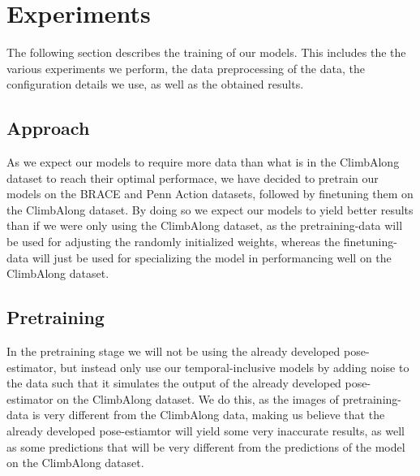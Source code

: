 \documentclass[./main.tex]{subfiles}
\begin{document}
\section{Experiments}
The following section describes the training of our models. This includes the the various experiments we perform, the data preprocessing of the data, the configuration details we use, as well as the obtained results.

\subsection{Approach}
As we expect our models to require more data than what is in the ClimbAlong dataset to reach their optimal performace, we have decided to pretrain our models on the BRACE and Penn Action datasets, followed by finetuning them on the ClimbAlong dataset. By doing so we expect our models to yield better results than if we were only using the ClimbAlong dataset, as the pretraining-data will be used for adjusting the randomly initialized weights, whereas the finetuning-data will just be used for specializing the model in performancing well on the ClimbAlong dataset.

\subsection{Pretraining}
In the pretraining stage we will not be using the already developed pose-estimator, but instead only use our temporal-inclusive models by adding noise to the data such that it simulates the output of the already developed pose-estimator on the ClimbAlong dataset. We do this, as the images of pretraining-data is very different from the ClimbAlong data, making us believe that the already developed pose-estiamtor will yield some very inaccurate results, as well as some predictions that will be very different from the predictions of the model on the ClimbAlong dataset.
\end{document}
